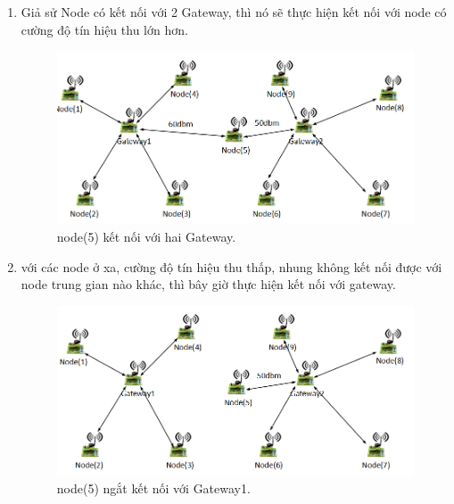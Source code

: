 \begin{enumerate}
    \item Giả sử Node có kết nối với 2 Gateway, thì nó sẽ thực hiện kết nối với node có cường độ tín hiệu thu lớn hơn.
\begin{center}
    \begin{figure}[htp]
    \begin{center}
     \includegraphics[scale=0.45]{image2/node5.png}
    \end{center}
    \caption{node(5) kết nối với hai Gateway.}
    \label{refhinh1}
    \end{figure}
\end{center}
\newpage
\item với các node ở xa, cường độ tín hiệu thu thấp, nhung không kết nối được với node trung gian nào khác, thì bây giờ thực hiện kết nối với gateway.
\begin{center}
    \begin{figure}[htp]
    \begin{center}
     \includegraphics[scale=0.45]{image2/node51.png}
    \end{center}
    \caption{node(5) ngắt kết nối với Gateway1.}
    \label{refhinh1}
    \end{figure}
\end{center}


\end{enumerate}
